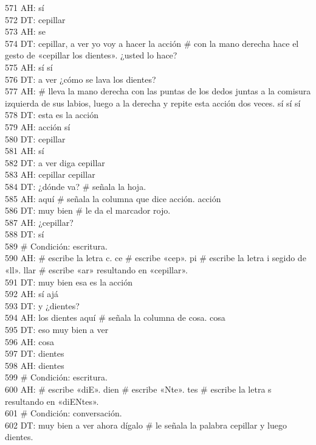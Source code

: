 571 AH: sí\\
572 DT: cepillar\\
573 AH: se\\
574 DT: cepillar, a ver yo voy a hacer la acción \# con la mano derecha hace el gesto de «cepillar los dientes». ¿usted lo hace?\\
575 AH: sí sí\\
576 DT: a ver ¿cómo se lava los dientes?\\
577 AH: \# lleva la mano derecha con las puntas de los dedos juntas a la comisura izquierda de sus labios, luego a la derecha y repite esta acción dos veces. sí sí sí\\
578 DT: esta es la acción\\
579 AH: acción sí\\
580 DT: cepillar\\
581 AH: sí\\
582 DT: a ver diga cepillar\\
583 AH: cepillar cepillar\\
584 DT: ¿dónde va? \# señala la hoja.\\
585 AH: aquí # señala la columna que dice acción. acción\\
586 DT: muy bien \# le da el marcador rojo.\\
587 AH: ¿cepillar?\\
588 DT: sí\\
589 \# Condición: escritura.\\
590 AH: \# escribe la letra c. ce # escribe «cep». pi # escribe la letra i segido de «ll». llar # escribe «ar» resultando en «cepillar».\\
591 DT: muy bien esa es la acción\\
592 AH: sí ajá\\
593 DT: y ¿dientes?\\
594 AH: los dientes aquí # señala la columna de cosa. cosa\\
595 DT: eso muy bien a ver\\
596 AH: cosa\\
597 DT: dientes\\
598 AH: dientes\\
599 \# Condición: escritura.\\
600 AH: \# escribe «diE». dien # escribe «Nte». tes # escribe la letra s resultando en «diENtes».\\
601 \# Condición: conversación.\\
602 DT: muy bien a ver ahora dígalo \# le señala la palabra cepillar y luego dientes.\\
